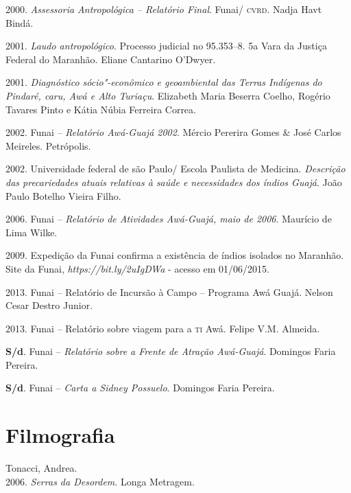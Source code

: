 \begin{bibliohedra}
2000. \emph{Assessoria Antropológica -- Relatório Final}. Funai/
\textsc{cvrd}. Nadja Havt Bindá.

2001. \emph{Laudo antropológico}. Processo judicial no
95.353--8. 5a Vara da Justiça Federal do Maranhão. Eliane Cantarino
O'Dwyer.

2001. \emph{Diagnóstico sócio"-econômico e geoambiental das
Terras Indígenas do Pindaré, caru, Awá e Alto Turiaçu}. Elizabeth Maria
Beserra Coelho, Rogério Tavares Pinto e Kátia Núbia Ferreira Correa.

2002. Funai -- \emph{Relatório Awá-Guajá 2002}. Mércio Pererira
Gomes \& José Carlos Meireles. Petrópolis.

2002. Universidade federal de são Paulo/ Escola Paulista de
Medicina. \emph{Descrição das precariedades atuais relativas à saúde e
necessidades dos índios Guajá}. João Paulo Botelho Vieira Filho.

2006. Funai -- \emph{Relatório de Atividades Awá-Guajá, maio de
2006}. Maurício de Lima Wilke.

2009. Expedição da Funai confirma a existência de índios
isolados no Maranhão. Site da Funai,
\emph{https://bit.ly/2uIgDWa} - acesso em 01/06/2015.

2013. Funai -- Relatório de Incursão à Campo -- Programa Awá
Guajá. Nelson Cesar Destro Junior.

2013. Funai -- Relatório sobre viagem para a \textsc{ti} Awá. Felipe V.M.
Almeida.

\textbf{S/d}. Funai -- \emph{Relatório sobre a Frente de Atração
Awá-Guajá}. Domingos Faria Pereira.

\textbf{S/d}. Funai -- \emph{Carta a Sidney Possuelo}. Domingos Faria
Pereira.

\section{Filmografia}

Tonacci, Andrea.\\
2006. \emph{Serras da Desordem}. Longa Metragem.
\end{bibliohedra}

